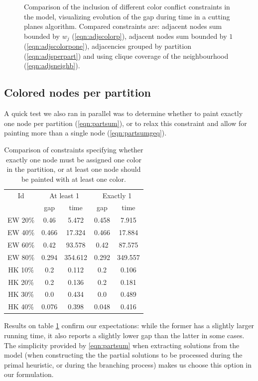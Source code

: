 \begin{figure}
\caption{Comparison of the inclusion of different color conflict constraints in the model, visualizing evolution of the gap during time in a cutting planes algorithm. Compared constraints are: adjacent nodes sum bounded by $w_j$ (\ref{eqn:adjscolorp}), adjacent nodes sum bounded by $1$ (\ref{eqn:adjscolorpone}), adjacencies grouped by partition (\ref{eqn:adjsperpart}) and using clique coverage of the neighbourhood (\ref{eqn:adjsneighb}).}
\label{fig:models:adj}
\end{figure}

\subsection{Colored nodes per partition}

A quick test we also ran in parallel was to determine whether to paint exactly one node per partition (\ref{eqn:partsum}), or to relax this constraint and allow for painting more than a single node (\ref{eqn:partsumgeq}). 

\begin{table}
\centering

\begin{tabular}{|c|cc|cc|}
\hline
\multicolumn{1}{|c|}{Id} & \multicolumn{2}{|c|}{At least 1} & \multicolumn{2}{|c|}{Exactly 1}
\\
 & gap & time & gap & time
\\
\hline
EW 20\% & 0.46 & 5.472 & 0.458 & 7.915
\\
EW 40\% & 0.466 & 17.324 & 0.466 & 17.884
\\
EW 60\% & 0.42 & 93.578 & 0.42 & 87.575
\\
EW 80\% & 0.294 & 354.612 & 0.292 & 349.557
\\
\hline
HK 10\% &  0.2 & 0.112 &  0.2 & 0.106
\\
HK 20\% &  0.2 & 0.136 &  0.2 & 0.181
\\
HK 30\% &  0.0 & 0.434 &  0.0 & 0.489
\\
HK 40\% & 0.076 & 0.398 & 0.048 & 0.416
\\
\hline 
 \end{tabular}

\caption{Comparison of constraints specifying whether exactly one node must be assigned one color in the partition, or at least one node should be painted with at least one color.}
\label{table:models:partsum}
\end{table}

Results on table \ref{table:models:partsum} confirm our expectations: while the former has a slightly larger running time, it also reports a slightly lower gap than the latter in some cases. The simplicity provided by \ref{eqn:partsum} when extracting solutions from the model (when constructing the the partial solutions to be processed during the primal heuristic, or during the branching process) makes us choose this option in our formulation.

